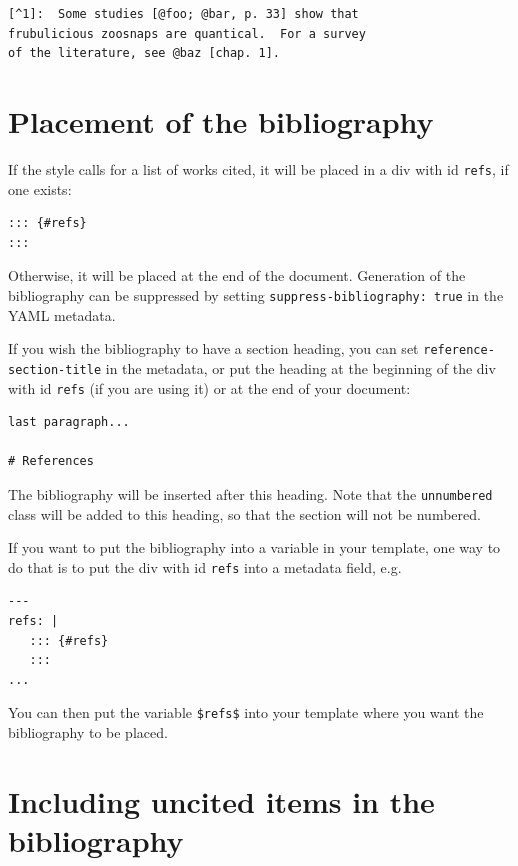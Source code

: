 \documentclass[
  b5paper
]{book}
\begin{document}
\begin{verbatim}
[^1]:  Some studies [@foo; @bar, p. 33] show that
frubulicious zoosnaps are quantical.  For a survey
of the literature, see @baz [chap. 1].
\end{verbatim}

\section{Placement of the
bibliography}\label{placement-of-the-bibliography}

If the style calls for a list of works cited, it will be placed in a div
with id \texttt{refs}, if one exists:

\begin{verbatim}
::: {#refs}
:::
\end{verbatim}

Otherwise, it will be placed at the end of the document. Generation of
the bibliography can be suppressed by setting
\texttt{suppress-bibliography:\ true} in the YAML metadata.

If you wish the bibliography to have a section heading, you can set
\texttt{reference-section-title} in the metadata, or put the heading at
the beginning of the div with id \texttt{refs} (if you are using it) or
at the end of your document:

\begin{verbatim}
last paragraph...

# References
\end{verbatim}

The bibliography will be inserted after this heading. Note that the
\texttt{unnumbered} class will be added to this heading, so that the
section will not be numbered.

If you want to put the bibliography into a variable in your template,
one way to do that is to put the div with id \texttt{refs} into a
metadata field, e.g.

\begin{verbatim}
---
refs: |
   ::: {#refs}
   :::
...
\end{verbatim}

You can then put the variable \texttt{\$refs\$} into your template where
you want the bibliography to be placed.

\section{Including uncited items in the
bibliography}\label{including-uncited-items-in-the-bibliography}
\end{document}
